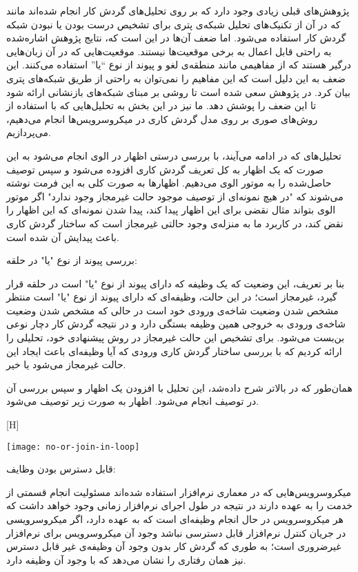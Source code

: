 پژوهش‌های قبلی زیادی وجود دارد که بر روی تحلیل‌های گردش کار انجام شده‌اند مانند  که در آن از تکنیک‌های تحلیل شبکه‌ی پتری برای تشخیص درست بودن یا نبودن شبکه گردش کار استفاده می‌شود. اما ضعف آن‌ها در این است که، نتایج پژوهش اشاره‌شده به‌ راحتی قابل اعمال به برخی موقعیت‌ها نیستند. موقعیت‌هایی که در آن زبان‌هایی درگیر هستند که از مفاهیمی مانند منطقه‌ی لغو و پیوند از نوع ``یا'' استفاده می‌کنند. این ضعف به این دلیل است که این مفاهیم را نمی‌توان به راحتی از طریق شبکه‌های پتری بیان کرد. در پژوهش  سعی شده است تا روشی بر مبنای شبکه‌های بازنشانی ارائه شود تا این ضعف را پوشش دهد. ما نیز در این بخش به تحلیل‌هایی که با استفاده از روش‌های صوری بر روی مدل گردش کاری در میکروسرویس‌ها انجام می‌دهیم، می‌پردازیم. 

تحلیل‌های که در ادامه می‌آیند، با بررسی درستی اظهار در الوی انجام می‌شود به این صورت که یک اظهار به کل تعریف گردش کاری افزوده می‌شود و سپس توصیف حاصل‌شده را به موتور الوی می‌دهیم. اظهارها به صورت کلی به این فرمت نوشته می‌شوند که "در هیچ نمونه‌ای از توصیف موجود حالت غیرمجاز وجود ندارد" اگر موتور الوی بتواند مثال نقضی برای این اظهار پیدا کند، پیدا شدن نمونه‌ای که این اظهار را نقض کند، در کاربرد ما به منزله‌ی وجود حالتی غیرمجاز است که ساختار گردش کاری باعث پیدایش آن شده است.

 بررسی پیوند از نوع "یا" در حلقه: 

بنا بر تعریف، این وضعیت که یک وظیفه که دارای پیوند از نوع "یا" است در حلقه قرار گیرد، غیرمجاز است؛ در این حالت، وظیفه‌ای که دارای پیوند از نوع "یا" است منتظر مشخص شدن وضعیت شاخه‌ی ورودی خود است در حالی که مشخص شدن وضعیت شاخه‌ی ورودی به خروجی همین وظیفه بستگی دارد و در نتیجه گردش کار دچار نوعی بن‌بست می‌شود. برای تشخیص این حالت غیرمجاز در روش پیشنهادی خود، تحلیلی را ارائه کردیم که با بررسی ساختار گردش کاری ورودی که آیا وظیفه‌ای باعث ایجاد این حالت غیرمجاز می‌شود یا خیر.

همان‌طور که در بالاتر شرح داده‌شد، این تحلیل با افزودن یک اظهار و سپس بررسی آن در توصیف انجام‌ می‌شود. اظهار به صورت زیر توصیف می‌شود. 



[H]
\raggedright
\texttt{[image: no-or-join-in-loop]}
\vspace{0.5em}




 قابل دسترس بودن وظایف:

میکروسرویس‌هایی که در معماری نرم‌افزار استفاده شده‌اند مسئولیت انجام قسمتی از خدمت را به عهده دارند در نتیجه در طول اجرای نرم‌افزار زمانی وجود خواهد داشت که هر میکروسرویس در حال انجام وظیفه‌ای است که به عهده دارد، اگر میکروسرویسی در جریان کنترل نرم‌افزار قابل دسترسی نباشد وجود آن میکروسرویس برای نرم‌افزار غیرضروری است؛ به طوری که گردش کار بدون وجود آن وظیفه‌‌ی غیر قابل دسترس نیز همان رفتاری را نشان می‌دهد که با وجود آن وظیفه دارد.

